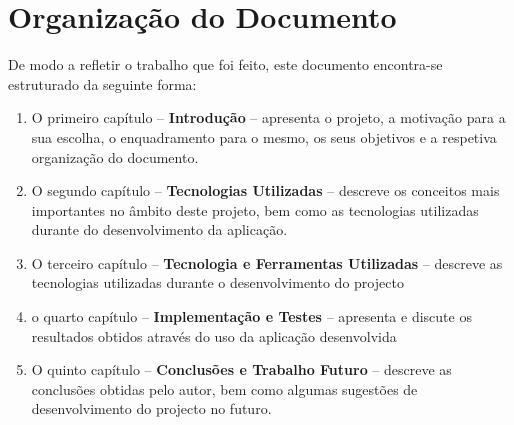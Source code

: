 \section{Organização do Documento}
\label{sec:organ}

De modo a refletir o trabalho que foi feito, este documento encontra-se estruturado da seguinte forma:
\begin{enumerate}
\item O primeiro capítulo -- \textbf{Introdução} -- apresenta o projeto, a motivação para a sua escolha, o enquadramento para o mesmo, os seus objetivos e a respetiva organização do documento.
\item O segundo capítulo -- \textbf{Tecnologias Utilizadas} -- descreve os conceitos mais importantes no âmbito deste projeto, bem como as tecnologias utilizadas durante do desenvolvimento da aplicação.
\item O terceiro capítulo -- \textbf{Tecnologia e Ferramentas Utilizadas} -- descreve as tecnologias utilizadas durante o desenvolvimento do projecto
\item o quarto capítulo -- \textbf{Implementação e Testes} -- apresenta e discute os resultados obtidos através do uso da aplicação desenvolvida
\item O quinto capítulo -- \textbf{Conclusões e Trabalho Futuro} -- descreve as conclusões obtidas pelo autor, bem como algumas sugestões de desenvolvimento do projecto no futuro.
\end{enumerate}
